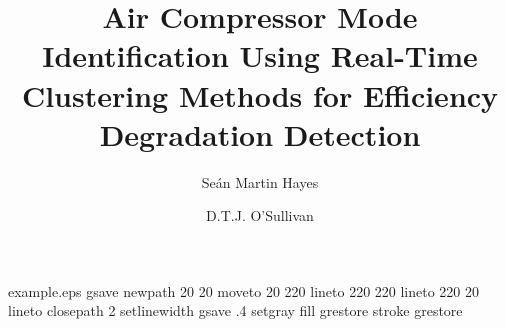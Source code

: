 %
%
%
%
%
\begin{filecontents*}{example.eps}
gsave
newpath
  20 20 moveto
  20 220 lineto
  220 220 lineto
  220 20 lineto
closepath
2 setlinewidth
gsave
  .4 setgray fill
grestore
stroke
grestore
\end{filecontents*}
%
\RequirePackage{fix-cm}
%
\documentclass[twocolumn]{svjour3}          %
%
\smartqed  %
%
\usepackage{graphicx}
%
\usepackage{mathptmx}      %
%
%
\usepackage[numbers]{natbib}
\usepackage{hyperref}
\usepackage{booktabs}
\usepackage{multirow}
\usepackage{tabularx}
\usepackage{longtable}
%
%


\title{Air Compressor Mode Identification Using Real-Time Clustering Methods for Efficiency Degradation Detection%
}


\author{Se\'an Martin Hayes         \and
        D.T.J. O'Sullivan %
}

